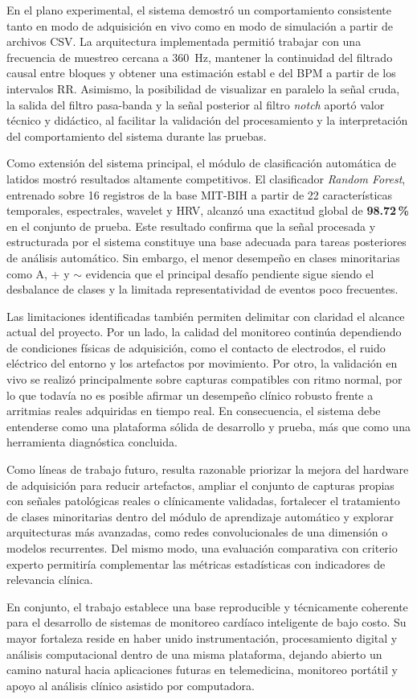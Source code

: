 En el plano experimental, el sistema demostró un comportamiento consistente tanto
en modo de adquisición en vivo como en modo de simulación a partir de archivos
CSV. La arquitectura implementada permitió trabajar con una frecuencia de
muestreo cercana a 360~Hz, mantener la continuidad del filtrado causal entre
bloques y obtener una estimación establ e del BPM a partir de los intervalos RR.
Asimismo, la posibilidad de visualizar en paralelo la señal cruda, la salida del
filtro pasa-banda y la señal posterior al filtro \textit{notch} aportó valor
técnico y didáctico, al facilitar la validación del procesamiento y la
interpretación del comportamiento del sistema durante las pruebas.

Como extensión del sistema principal, el módulo de clasificación automática de
latidos mostró resultados altamente competitivos. El clasificador
\textit{Random Forest}, entrenado sobre 16 registros de la base MIT-BIH a partir
de 22 características temporales, espectrales, wavelet y HRV, alcanzó una
exactitud global de \textbf{98.72\,\%} en el conjunto de prueba. Este resultado
confirma que la señal procesada y estructurada por el sistema constituye una base
adecuada para tareas posteriores de análisis automático. Sin embargo, el menor
desempeño en clases minoritarias como A, + y $\sim$ evidencia que el principal
desafío pendiente sigue siendo el desbalance de clases y la limitada
representatividad de eventos poco frecuentes.

Las limitaciones identificadas también permiten delimitar con claridad el alcance
actual del proyecto. Por un lado, la calidad del monitoreo continúa dependiendo
de condiciones físicas de adquisición, como el contacto de electrodos, el ruido
eléctrico del entorno y los artefactos por movimiento. Por otro, la validación
en vivo se realizó principalmente sobre capturas compatibles con ritmo normal,
por lo que todavía no es posible afirmar un desempeño clínico robusto frente a
arritmias reales adquiridas en tiempo real. En consecuencia, el sistema debe
entenderse como una plataforma sólida de desarrollo y prueba, más que como una
herramienta diagnóstica concluida.

Como líneas de trabajo futuro, resulta razonable priorizar la mejora del
hardware de adquisición para reducir artefactos, ampliar el conjunto de capturas
propias con señales patológicas reales o clínicamente validadas, fortalecer el
tratamiento de clases minoritarias dentro del módulo de aprendizaje automático y
explorar arquitecturas más avanzadas, como redes convolucionales de una dimensión
o modelos recurrentes. Del mismo modo, una evaluación comparativa con criterio
experto permitiría complementar las métricas estadísticas con indicadores de
relevancia clínica.

En conjunto, el trabajo establece una base reproducible y técnicamente coherente
para el desarrollo de sistemas de monitoreo cardíaco inteligente de bajo costo.
Su mayor fortaleza reside en haber unido instrumentación, procesamiento digital y
análisis computacional dentro de una misma plataforma, dejando abierto un camino
natural hacia aplicaciones futuras en telemedicina, monitoreo portátil y apoyo
al análisis clínico asistido por computadora.
